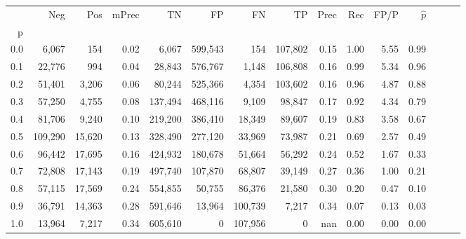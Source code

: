 \begin{tabular}{rrrrrrrrrrrrrrr}
\toprule
{} &      Neg &     Pos & mPrec &       TN &       FP &       FN &       TP &  Prec &   Rec &  FP/P & $\hat{p}$ \\
p   &          &         &       &          &          &          &          &       &       &       &           \\
\midrule
0.0 &    6,067 &     154 &  0.02 &    6,067 &  599,543 &      154 &  107,802 &  0.15 &  1.00 &  5.55 &      0.99 \\
0.1 &   22,776 &     994 &  0.04 &   28,843 &  576,767 &    1,148 &  106,808 &  0.16 &  0.99 &  5.34 &      0.96 \\
0.2 &   51,401 &   3,206 &  0.06 &   80,244 &  525,366 &    4,354 &  103,602 &  0.16 &  0.96 &  4.87 &      0.88 \\
0.3 &   57,250 &   4,755 &  0.08 &  137,494 &  468,116 &    9,109 &   98,847 &  0.17 &  0.92 &  4.34 &      0.79 \\
0.4 &   81,706 &   9,240 &  0.10 &  219,200 &  386,410 &   18,349 &   89,607 &  0.19 &  0.83 &  3.58 &      0.67 \\
0.5 &  109,290 &  15,620 &  0.13 &  328,490 &  277,120 &   33,969 &   73,987 &  0.21 &  0.69 &  2.57 &      0.49 \\
0.6 &   96,442 &  17,695 &  0.16 &  424,932 &  180,678 &   51,664 &   56,292 &  0.24 &  0.52 &  1.67 &      0.33 \\
0.7 &   72,808 &  17,143 &  0.19 &  497,740 &  107,870 &   68,807 &   39,149 &  0.27 &  0.36 &  1.00 &      0.21 \\
0.8 &   57,115 &  17,569 &  0.24 &  554,855 &   50,755 &   86,376 &   21,580 &  0.30 &  0.20 &  0.47 &      0.10 \\
0.9 &   36,791 &  14,363 &  0.28 &  591,646 &   13,964 &  100,739 &    7,217 &  0.34 &  0.07 &  0.13 &      0.03 \\
1.0 &   13,964 &   7,217 &  0.34 &  605,610 &        0 &  107,956 &        0 &   nan &  0.00 &  0.00 &      0.00 \\
\bottomrule
\end{tabular}
